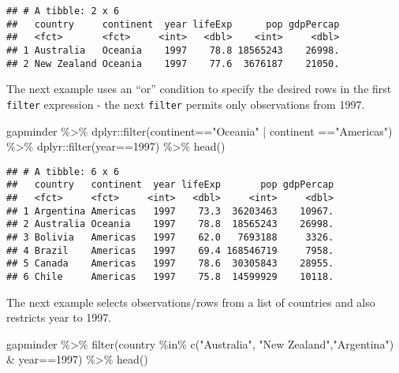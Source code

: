 \documentclass[
]{book}
\newenvironment{Shaded}{\begin{snugshade}}{\end{snugshade}}
\newcommand{\DecValTok}[1]{\textcolor[rgb]{0.00,0.00,0.81}{#1}}
\newcommand{\FunctionTok}[1]{\textcolor[rgb]{0.00,0.00,0.00}{#1}}
\newcommand{\NormalTok}[1]{#1}
\newcommand{\SpecialCharTok}[1]{\textcolor[rgb]{0.00,0.00,0.00}{#1}}
\newcommand{\StringTok}[1]{\textcolor[rgb]{0.31,0.60,0.02}{#1}}
\begin{document}
\begin{verbatim}
## # A tibble: 2 x 6
##   country     continent  year lifeExp      pop gdpPercap
##   <fct>       <fct>     <int>   <dbl>    <int>     <dbl>
## 1 Australia   Oceania    1997    78.8 18565243    26998.
## 2 New Zealand Oceania    1997    77.6  3676187    21050.
\end{verbatim}

The next example uses an ``or'' condition to specify the desired rows in the first \texttt{filter} expression - the next \texttt{filter} permits only observations from 1997.

\begin{Shaded}
\begin{Highlighting}[]
\NormalTok{gapminder }\SpecialCharTok{\%\textgreater{}\%} 
\NormalTok{  dplyr}\SpecialCharTok{::}\FunctionTok{filter}\NormalTok{(continent}\SpecialCharTok{==}\StringTok{"Oceania"} \SpecialCharTok{|}\NormalTok{ continent }\SpecialCharTok{==}\StringTok{"Americas"}\NormalTok{) }\SpecialCharTok{\%\textgreater{}\%}
\NormalTok{  dplyr}\SpecialCharTok{::}\FunctionTok{filter}\NormalTok{(year}\SpecialCharTok{==}\DecValTok{1997}\NormalTok{) }\SpecialCharTok{\%\textgreater{}\%} 
  \FunctionTok{head}\NormalTok{()}
\end{Highlighting}
\end{Shaded}

\begin{verbatim}
## # A tibble: 6 x 6
##   country   continent  year lifeExp       pop gdpPercap
##   <fct>     <fct>     <int>   <dbl>     <int>     <dbl>
## 1 Argentina Americas   1997    73.3  36203463    10967.
## 2 Australia Oceania    1997    78.8  18565243    26998.
## 3 Bolivia   Americas   1997    62.0   7693188     3326.
## 4 Brazil    Americas   1997    69.4 168546719     7958.
## 5 Canada    Americas   1997    78.6  30305843    28955.
## 6 Chile     Americas   1997    75.8  14599929    10118.
\end{verbatim}

The next example selects observations/rows from a list of countries and also restricts year to 1997.

\begin{Shaded}
\begin{Highlighting}[]
\NormalTok{gapminder }\SpecialCharTok{\%\textgreater{}\%} 
  \FunctionTok{filter}\NormalTok{(country }\SpecialCharTok{\%in\%} \FunctionTok{c}\NormalTok{(}\StringTok{"Australia"}\NormalTok{, }\StringTok{"New Zealand"}\NormalTok{,}\StringTok{"Argentina"}\NormalTok{) }\SpecialCharTok{\&}\NormalTok{ year}\SpecialCharTok{==}\DecValTok{1997}\NormalTok{) }\SpecialCharTok{\%\textgreater{}\%} 
  \FunctionTok{head}\NormalTok{()}
\end{Highlighting}
\end{Shaded}
\end{document}
